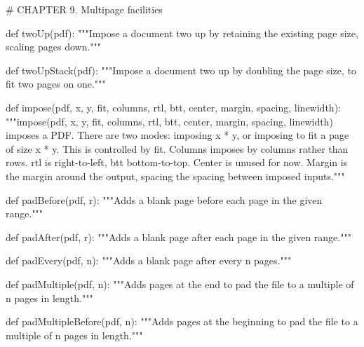 # CHAPTER 9. Multipage facilities

def twoUp(pdf):
    """Impose a document two up by retaining the existing page
    size, scaling pages down."""

def twoUpStack(pdf):
    """Impose a document two up by doubling the page size,
    to fit two pages on one."""

def impose(pdf, x, y, fit, columns, rtl, btt, center, margin, spacing, linewidth):
    """impose(pdf, x, y, fit, columns, rtl, btt, center, margin, spacing,
    linewidth) imposes a PDF. There are two modes: imposing x * y, or imposing
    to fit a page of size x * y. This is controlled by fit. Columns imposes by
    columns rather than rows. rtl is right-to-left, btt bottom-to-top. Center
    is unused for now. Margin is the margin around the output, spacing the
    spacing between imposed inputs."""

def padBefore(pdf, r):
    """Adds a blank page before each page in the given range."""

def padAfter(pdf, r):
    """Adds a blank page after each page in the given range."""

def padEvery(pdf, n):
    """Adds a blank page after every n pages."""

def padMultiple(pdf, n):
    """Adds pages at the end to pad the file to a multiple of n pages in
    length."""

def padMultipleBefore(pdf, n):
    """Adds pages at the beginning to pad the file to a
    multiple of n pages in length."""
